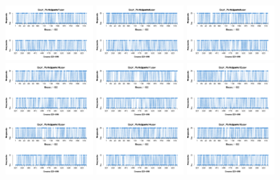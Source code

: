 \documentclass[a4paper ]{article}
\begin{document}
\begin{figure}[th]
\includegraphics[width=0.3\textwidth]{Figures/Response_Exp1_P7} \includegraphics[width=0.3\textwidth]{Figures/Response_Exp1_P8} \includegraphics[width=0.3\textwidth]{Figures/Response_Exp1_P9}
\includegraphics[width=0.3\textwidth]{Figures/Response_Exp1_P10} \includegraphics[width=0.3\textwidth]{Figures/Response_Exp1_P11} \includegraphics[width=0.3\textwidth]{Figures/Response_Exp1_P12}
\includegraphics[width=0.3\textwidth]{Figures/Response_Exp1_P13} \includegraphics[width=0.3\textwidth]{Figures/Response_Exp1_P14} \includegraphics[width=0.3\textwidth]{Figures/Response_Exp1_P15}

\end{figure}
\end{document}

